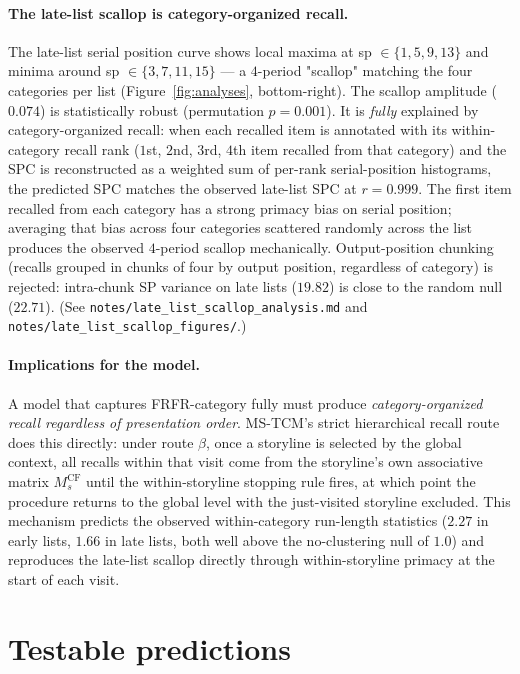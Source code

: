 \documentclass[10pt]{article}
\newcommand{\MCFs}{M^{\mathrm{CF}}_{s}}
\begin{document}
\paragraph{The late-list scallop is category-organized recall.}
The late-list serial position curve shows local maxima at sp $\in
\{1, 5, 9, 13\}$ and minima around sp $\in \{3, 7, 11, 15\}$ --- a
$4$-period "scallop" matching the four categories per list
(Figure~\ref{fig:analyses}, bottom-right). The scallop amplitude
($0.074$) is statistically robust (permutation $p = 0.001$). It is
\emph{fully} explained by category-organized recall: when each recalled
item is annotated with its within-category recall rank
($1$st, $2$nd, $3$rd, $4$th item recalled from that category) and the
SPC is reconstructed as a weighted sum of per-rank serial-position
histograms, the predicted SPC matches the observed late-list SPC at
$r = 0.999$. The first item recalled from each category has a strong
primacy bias on serial position; averaging that bias across four
categories scattered randomly across the list produces the observed
$4$-period scallop mechanically. Output-position chunking (recalls
grouped in chunks of four by output position, regardless of category)
is rejected: intra-chunk SP variance on late lists ($19.82$) is close
to the random null ($22.71$). (See
\texttt{notes/late\_list\_scallop\_analysis.md} and
\texttt{notes/late\_list\_scallop\_figures/}.)

\paragraph{Implications for the model.}
A model that captures FRFR-category fully must produce
\emph{category-organized recall regardless of presentation order}.
MS-TCM's strict hierarchical recall route does this directly: under
route $\beta$, once a storyline is selected by the global context,
all recalls within that visit come from the storyline's own
associative matrix $\MCFs$ until the within-storyline stopping rule
fires, at which point the procedure returns to the global level with
the just-visited storyline excluded. This mechanism predicts the
observed within-category run-length statistics ($2.27$ in early
lists, $1.66$ in late lists, both well above the no-clustering null
of $1.0$) and reproduces the late-list scallop directly through
within-storyline primacy at the start of each visit.

\section{Testable predictions}
\label{sec:predictions}
\end{document}
